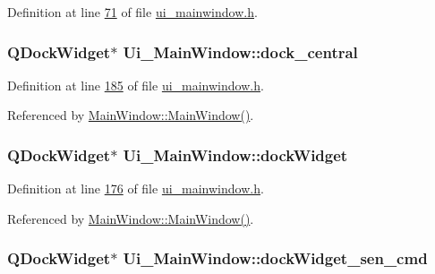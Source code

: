 Definition at line \hyperlink{a00052_source_l00071}{71} of file \hyperlink{a00052_source}{ui\+\_\+mainwindow.\+h}.

\hypertarget{a00027_a19105d0d919fa33b5f29f7677bbab054}{
\subsubsection[{dock\+\_\+central}]{\setlength{\rightskip}{0pt plus 5cm}Q\+Dock\+Widget$\ast$ Ui\+\_\+\+Main\+Window\+::dock\+\_\+central}}\label{a00027_a19105d0d919fa33b5f29f7677bbab054}


Definition at line \hyperlink{a00052_source_l00185}{185} of file \hyperlink{a00052_source}{ui\+\_\+mainwindow.\+h}.



Referenced by \hyperlink{a00038_source_l00024}{Main\+Window\+::\+Main\+Window()}.

\hypertarget{a00027_ac8a083c4b66fb317a9b538409ce412e2}{
\subsubsection[{dock\+Widget}]{\setlength{\rightskip}{0pt plus 5cm}Q\+Dock\+Widget$\ast$ Ui\+\_\+\+Main\+Window\+::dock\+Widget}}\label{a00027_ac8a083c4b66fb317a9b538409ce412e2}


Definition at line \hyperlink{a00052_source_l00176}{176} of file \hyperlink{a00052_source}{ui\+\_\+mainwindow.\+h}.



Referenced by \hyperlink{a00038_source_l00024}{Main\+Window\+::\+Main\+Window()}.

\hypertarget{a00027_a9eb86a5ee396766f0f4a65f2d2bd7688}{
\subsubsection[{dock\+Widget\+\_\+sen\+\_\+cmd}]{\setlength{\rightskip}{0pt plus 5cm}Q\+Dock\+Widget$\ast$ Ui\+\_\+\+Main\+Window\+::dock\+Widget\+\_\+sen\+\_\+cmd}}\label{a00027_a9eb86a5ee396766f0f4a65f2d2bd7688}


